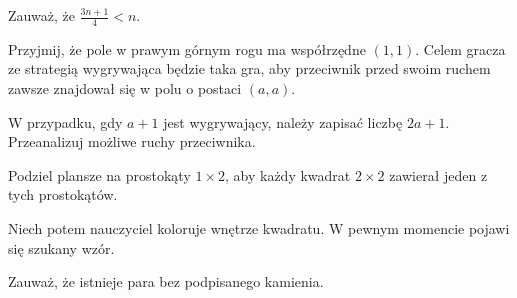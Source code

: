 
\begin{hints_list}
	\item Zauważ, że $\frac{3n + 1}{4} < n$.
	\item Przyjmij, że pole w prawym górnym rogu ma współrzędne $(1, 1)$. Celem gracza ze strategią wygrywająca będzie taka gra, aby przeciwnik przed swoim ruchem zawsze znajdował się w polu o postaci $(a, a)$.
	\item W przypadku, gdy $a + 1$ jest wygrywający, należy zapisać liczbę $2a + 1$. Przeanalizuj możliwe ruchy przeciwnika.
	\item Podziel plansze na prostokąty $1 \times 2$, aby każdy kwadrat $2 \times 2$ zawierał jeden z tych prostokątów.
	\item Niech potem nauczyciel koloruje wnętrze kwadratu. W pewnym momencie pojawi się szukany wzór.
	\item Zauważ, że istnieje para bez podpisanego kamienia. 
\end{hints_list}